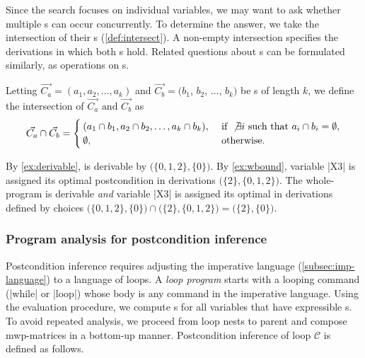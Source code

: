 \noindent
Since the search focuses on individual variables, we may want to ask whether
multiple s can occur concurrently. To determine the answer,
we take the intersection of their s
(\autoref{def:intersect}). A non-empty intersection specifies the derivations in
which both s hold. Related questions about
s can be formulated similarly, as operations on s.

\begin{definition}
\label{def:intersect}
Letting \(\vec{C_a} = (a_1, a_2,\dots,a_k) \) and \(\vec{C_b} =
(b_1\), \(b_2\), \(\dots\), \(b_k)\) be s of length
\(k\), we define the intersection of \(\vec{C_a} \text{ and }
\vec{C_b} \) as \[ \vec{C_a} \cap \vec{C_b} = \begin{cases} (a_1 \cap b_1, a_2
\cap b_2, \dots, a_k \cap b_k), & \text{ if } \not\exists i \text{ such that }
a_i \cap b_i = \emptyset, \\ \emptyset, & \text{ otherwise.}\end{cases}
\]%
\end{definition}

\begin{example}
\label{ex:opt-derivation}
By \autoref{ex:derivable}, \exname is derivable by
 \(\big(\{0, 1, 2\}, \{0\}\big)\). By \autoref{ex:wbound},
variable \pr|X3| is assigned its optimal postcondition in derivations
\(\big(\{2\}, \{0,1,2\}\big)\). The whole-program is derivable \emph{and}
variable \pr|X3| is assigned its optimal  in derivations
defined by choices \( \big(\{0, 1, 2\}, \{0\}\big) \cap \big(\{2\},
\{0,1,2\}\big) = \big( \{2\}, \{0\}\big) \).
\end{example}

\subsubsection{Program analysis for postcondition inference}
\label{subsec:inference}

Postcondition inference requires adjusting the imperative
language (\autoref{subsec:imp-language}) to a
language of loops. A \emph{loop program} starts with a looping command
(\pr|while| or \pr|loop|) whose body is any command in the
imperative language. Using the  evaluation procedure, we compute
s for all variables that have expressible s.
To avoid repeated analysis, we proceed from loop nests to
parent and compose mwp-matrices in a bottom-up manner.
Postcondition inference of loop
\(\mathcal{C}\) is defined as follows.

